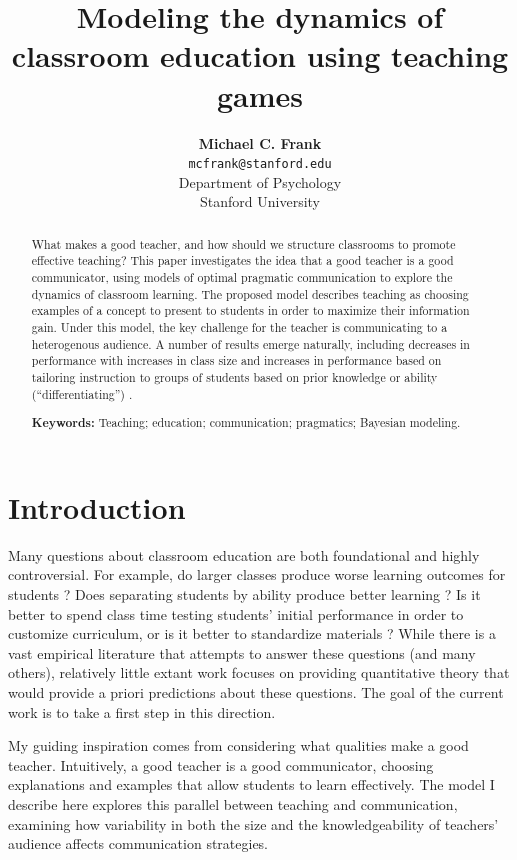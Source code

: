 \documentclass[10pt,letterpaper]{article}
\title{Modeling the dynamics of classroom education using teaching games}
\author{{\large \bf Michael C. Frank} \\
  \texttt{mcfrank@stanford.edu} \\
  Department of Psychology\\
  Stanford University}
\begin{document}
\maketitle

\begin{abstract}
What makes a good teacher, and how should we structure classrooms to promote effective teaching? This paper investigates the idea that a good teacher is a good communicator, using models of optimal pragmatic communication to explore the dynamics of classroom learning. The proposed model describes teaching as choosing examples of a concept to present to students in order to maximize their information gain. Under this model, the key challenge for the teacher is communicating to a heterogenous audience. A number of results emerge naturally, including decreases in performance with increases in class size and increases in performance based on tailoring instruction to groups of students based on prior knowledge or ability  (``differentiating'') .

\textbf{Keywords:} 
Teaching; education; communication; pragmatics; Bayesian modeling.
\end{abstract}

\section{Introduction}

Many questions about classroom education are both foundational and highly controversial. For example, do larger classes produce worse learning outcomes for students \cite{glass1979,slavin1989}? Does separating students by ability produce better learning \cite{slavin1987,tomlinson1999}? Is it better to spend class time testing students' initial performance in order to customize curriculum, or is it better to standardize materials \cite{fuchs1986}? While there is a vast empirical literature that attempts to answer these questions (and many others), relatively little extant work focuses on providing quantitative theory that would provide a priori predictions about these questions. The goal of the current work is to take a first step in this direction.

My guiding inspiration comes from considering what qualities make a good teacher. Intuitively, a good teacher is a good communicator, choosing explanations and examples that allow students to learn effectively. The model I describe here explores this parallel between teaching and communication, examining how variability in both the size and the knowledgeability of teachers' audience affects communication strategies. 
\end{document}
